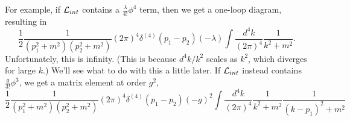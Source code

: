 For example, if $\mathcal L_{int}$ contains a $\frac{\lambda}{4!}\phi^4$ term, then we get a one-loop diagram, resulting in 
\begin{equation}
    \frac{1}{2} \frac{1}{(p_1^2+m^2)(p_2^2 +m^2)} (2\pi)^4 \delta^{(4)}(p_1-p_2)(-\lambda) \int \frac{d^4k}{(2\pi)^4} \frac{1}{k^2+m^2}.
\end{equation}
Unfortunately, this is infinity. (This is because $d^4k / k^2$ scales as $k^2$, which diverges for large $k$.) We'll see what to do with this a little later. If $\mathcal L_{int}$ instead contains $\frac{g}{3!}\phi^3$, we get a matrix element at order $g^2$,
\begin{equation}
    \frac{1}{2} \frac{1}{(p_1^2+m^2)(p_2^2+m^2)} (2\pi)^4 \delta^{(4)}(p_1-p_2)(-g)^2 \int \frac{d^4k}{(2\pi)^4} \frac{1}{k^2+m^2} \frac{1}{(k-p_1)^2 +m^2}
\end{equation}